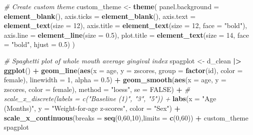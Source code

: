 \documentclass[
]{article}
\newenvironment{Shaded}{\begin{snugshade}}{\end{snugshade}}
\newcommand{\AttributeTok}[1]{\textcolor[rgb]{0.13,0.29,0.53}{#1}}
\newcommand{\CommentTok}[1]{\textcolor[rgb]{0.56,0.35,0.01}{\textit{#1}}}
\newcommand{\ConstantTok}[1]{\textcolor[rgb]{0.56,0.35,0.01}{#1}}
\newcommand{\DecValTok}[1]{\textcolor[rgb]{0.00,0.00,0.81}{#1}}
\newcommand{\FloatTok}[1]{\textcolor[rgb]{0.00,0.00,0.81}{#1}}
\newcommand{\FunctionTok}[1]{\textcolor[rgb]{0.13,0.29,0.53}{\textbf{#1}}}
\newcommand{\NormalTok}[1]{#1}
\newcommand{\OtherTok}[1]{\textcolor[rgb]{0.56,0.35,0.01}{#1}}
\newcommand{\SpecialCharTok}[1]{\textcolor[rgb]{0.81,0.36,0.00}{\textbf{#1}}}
\newcommand{\StringTok}[1]{\textcolor[rgb]{0.31,0.60,0.02}{#1}}
\begin{document}
\begin{Shaded}
\begin{Highlighting}[]
\CommentTok{\# Create custom theme}
\NormalTok{custom\_theme }\OtherTok{\textless{}{-}} \FunctionTok{theme}\NormalTok{(}
  \AttributeTok{panel.background =} \FunctionTok{element\_blank}\NormalTok{(),}
  \AttributeTok{axis.ticks =} \FunctionTok{element\_blank}\NormalTok{(),}
  \AttributeTok{axis.text =} \FunctionTok{element\_text}\NormalTok{(}\AttributeTok{size =} \DecValTok{12}\NormalTok{),}
  \AttributeTok{axis.title =} \FunctionTok{element\_text}\NormalTok{(}\AttributeTok{size =} \DecValTok{12}\NormalTok{, }\AttributeTok{face =} \StringTok{"bold"}\NormalTok{),}
  \AttributeTok{axis.line =} \FunctionTok{element\_line}\NormalTok{(}\AttributeTok{size =} \FloatTok{0.5}\NormalTok{),}
  \AttributeTok{plot.title =} \FunctionTok{element\_text}\NormalTok{(}\AttributeTok{size =} \DecValTok{14}\NormalTok{, }\AttributeTok{face =} \StringTok{"bold"}\NormalTok{, }\AttributeTok{hjust =} \FloatTok{0.5}\NormalTok{)}
\NormalTok{)}

\CommentTok{\# Spaghetti plot of whole mouth average gingival index}
\NormalTok{spagplot }\OtherTok{\textless{}{-}}\NormalTok{ d\_clean }\SpecialCharTok{|\textgreater{}}
  \FunctionTok{ggplot}\NormalTok{() }\SpecialCharTok{+}
  \FunctionTok{geom\_line}\NormalTok{(}\FunctionTok{aes}\NormalTok{(}\AttributeTok{x =}\NormalTok{ age, }\AttributeTok{y =}\NormalTok{ zscores, }\AttributeTok{group =} \FunctionTok{factor}\NormalTok{(id), }\AttributeTok{color =}\NormalTok{ female), }\AttributeTok{linewidth =} \DecValTok{1}\NormalTok{, }\AttributeTok{alpha =} \FloatTok{0.5}\NormalTok{) }\SpecialCharTok{+}
  \FunctionTok{geom\_smooth}\NormalTok{(}\FunctionTok{aes}\NormalTok{(}\AttributeTok{x =}\NormalTok{ age, }\AttributeTok{y =}\NormalTok{ zscores, }\AttributeTok{color =}\NormalTok{ female), }\AttributeTok{method =} \StringTok{"loess"}\NormalTok{, }\AttributeTok{se =} \ConstantTok{FALSE}\NormalTok{) }\SpecialCharTok{+}
  \CommentTok{\# scale\_x\_discrete(labels = c("Baseline (1)", "3", "5")) +}
  \FunctionTok{labs}\NormalTok{(}\AttributeTok{x =} \StringTok{"Age (Months)"}\NormalTok{, }\AttributeTok{y =} \StringTok{"Weight{-}for{-}age z{-}scores"}\NormalTok{, }\AttributeTok{color =} \StringTok{"Sex"}\NormalTok{) }\SpecialCharTok{+}
  \FunctionTok{scale\_x\_continuous}\NormalTok{(}\AttributeTok{breaks =} \FunctionTok{seq}\NormalTok{(}\DecValTok{0}\NormalTok{,}\DecValTok{60}\NormalTok{,}\DecValTok{10}\NormalTok{),}\AttributeTok{limits =} \FunctionTok{c}\NormalTok{(}\DecValTok{0}\NormalTok{,}\DecValTok{60}\NormalTok{)) }\SpecialCharTok{+}
\NormalTok{  custom\_theme}
\NormalTok{spagplot}
\end{Highlighting}
\end{Shaded}
\end{document}
